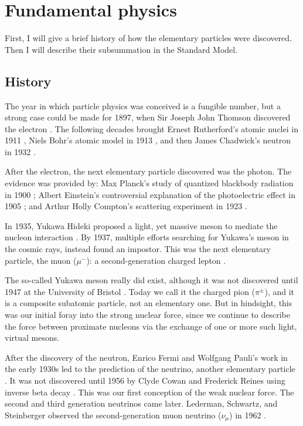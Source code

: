 \chapter{Fundamental physics}
First, I will give a brief history of how the elementary particles were discovered.
Then I will describe their subsummation in the Standard Model.

\section{History}

The year in which particle physics was conceived is a fungible number,
but a strong case could be made for 1897, 
when Sir Joseph John Thomson discovered the electron \cite{Thomson1897}.
The following decades brought Ernest Rutherford's atomic nuclei in 1911 \cite{Rutherford1911}, 
Niels Bohr's atomic model in 1913 \cite{Bohr1913}, 
and then James Chadwick's neutron in 1932 \cite{Chadwick1932}.

After the electron, the next elementary particle discovered was the photon.
The evidence was provided by: 
Max Planck's study of quantized blackbody radiation in 1900 \cite{Planck1901};
Albert Einstein's controversial explanation of the photoelectric effect in 1905 \cite{Einstein1905};
and Arthur Holly Compton's scattering experiment in 1923 \cite{Compton1923}.

In 1935, Yukawa Hideki proposed a light, yet massive meson to mediate the nucleon interaction \cite{Yukawa1935}.
By 1937, multiple efforts searching for Yukawa's meson in the cosmic rays, instead found an impostor.
This was the next elementary particle, the muon ($\mu^-$): a second-generation charged lepton \cite{Stevenson1937} \cite{Anderson1937}.

The so-called Yukawa meson really did exist, although it was not discovered until 1947 at the University of Bristol \cite{Lattes1947}.
Today we call it the charged pion ($\pi^\pm$), and it is a composite subatomic particle, 
not an elementary one. But in hindsight, 
this was our initial foray into the strong nuclear force,
since we continue to describe the force between proximate nucleons
via the exchange of one or more such light, virtual mesons.

After the discovery of the neutron, Enrico Fermi and Wolfgang Pauli's work in the early 1930s 
led to the prediction of the neutrino, another elementary particle \cite{Fermi1934}. 
It was not discovered until 1956 by Clyde Cowan and Frederick Reines using inverse beta decay \cite{Cowan1956}.
This was our first conception of the weak nuclear force. 
The second and third generation neutrinos came later. 
Lederman, Schwartz, and Steinberger observed the second-generation muon neutrino 
($\nu_\mu$) in 1962 \cite{Lederman1962}.

